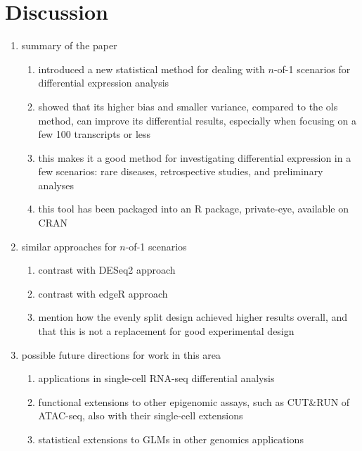 \section{Discussion}

\begin{enumerate}
  \item summary of the paper
  \begin{enumerate}
    \item introduced a new statistical method for dealing with $n$-of-1 scenarios for differential expression analysis
    \item showed that its higher bias and smaller variance, compared to the \gls{ols} method, can improve its differential results, especially when focusing on a few 100 transcripts or less
    \item this makes it a good method for investigating differential expression in a few scenarios: rare diseases, retrospective studies, and preliminary analyses
    \item this tool has been packaged into an R package, private-eye, available on CRAN
  \end{enumerate}
  \item similar approaches for $n$-of-1 scenarios
  \begin{enumerate}
    \item contrast with DESeq2 approach
    \item contrast with edgeR approach
    \item mention how the evenly split design achieved higher results overall, and that this is not a replacement for good experimental design
  \end{enumerate}
  \item possible future directions for work in this area
  \begin{enumerate}
    \item applications in single-cell RNA-seq differential analysis
    \item functional extensions to other epigenomic assays, such as CUT\&RUN of ATAC-seq, also with their single-cell extensions
    \item statistical extensions to GLMs in other genomics applications
  \end{enumerate}
\end{enumerate}
